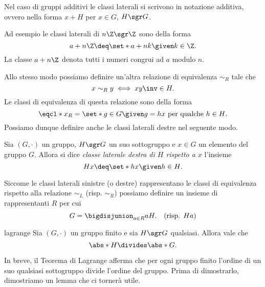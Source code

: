 \begin{remark}
    Nel caso di gruppi additivi le classi laterali si scrivono in notazione additiva, ovvero nella forma $x + H$ per $x \in G$, $H \sgr G$.
\end{remark}

\begin{example}
    Ad esempio le classi laterali di $n\Z \sgr \Z$ sono della forma \[
        a + n\Z \deq \set*{a + nk \given k \in \Z}.
    \] La classe $a + n\Z$ denota tutti i numeri congrui ad $a$ modulo $n$.
\end{example}

Allo stesso modo possiamo definire un'altra relazione di equivalenza $\sim_R$ tale che \[
    x \sim_R y \iff xy\inv \in H.    
\] Le classi di equivalenza di questa relazione sono della forma \[
    \eqcl*{x}_R = \set*{g \in G \given g = hx \text{ per qualche } h \in H}.    
\] Possiamo dunque definire anche le classi laterali destre nel seguente modo.
\begin{definition}
    Sia $(G, \cdot)$ un gruppo, $H \sgr G$ un suo sottogruppo e $x \in G$ un elemento del gruppo $G$.
    Allora si dice \emph{classe laterale destra di $H$ rispetto a $x$} l'insieme \[
        Hx \deq \set*{hx \given h \in H}. 
    \]
\end{definition}

\begin{remark}
    Siccome le classi laterali sinistre (o destre) rappresentano le classi di equivalenza rispetto alla relazione $\sim_L$ (risp. $\sim_R$) possiamo definire un insieme di rappresentanti $R$ per cui \begin{equation}
        G = \bigdisjunion_{a \in R} aH. \quad \text{(risp. $Ha$)}
    \end{equation}
\end{remark}

\begin{theorem}
     {lagrange}
    Sia $(G, \cdot)$ un gruppo finito e sia $H \sgr G$ qualsiasi. Allora vale che \[
        \abs*{H} \divides \abs*{G}.    
    \]
\end{theorem}

In breve, il Teorema di Lagrange afferma che per ogni gruppo finito l'ordine di un suo qualsiasi sottogruppo divide l'ordine del gruppo. Prima di dimostrarlo, dimostriamo un lemma che ci tornerà utile.

